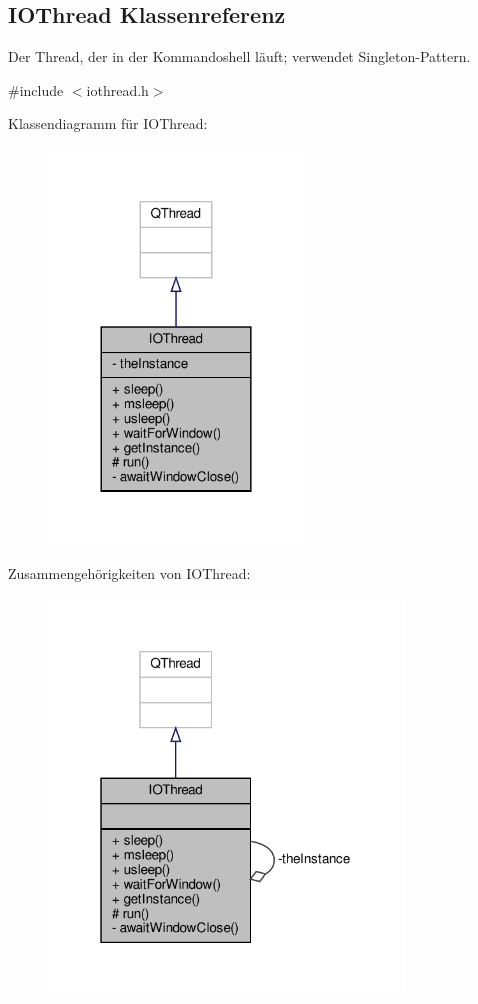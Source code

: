\hypertarget{classIOThread}{}\subsection{I\+O\+Thread Klassenreferenz}
\label{classIOThread}


Der Thread, der in der Kommandoshell läuft; verwendet Singleton-\/\+Pattern.  




{\ttfamily \#include $<$iothread.\+h$>$}



Klassendiagramm für I\+O\+Thread\+:
\nopagebreak
\begin{figure}[H]
\begin{center}
\leavevmode
\includegraphics[width=192pt]{classIOThread__inherit__graph}
\end{center}
\end{figure}


Zusammengehörigkeiten von I\+O\+Thread\+:
\nopagebreak
\begin{figure}[H]
\begin{center}
\leavevmode
\includegraphics[width=268pt]{classIOThread__coll__graph}
\end{center}
\end{figure}
